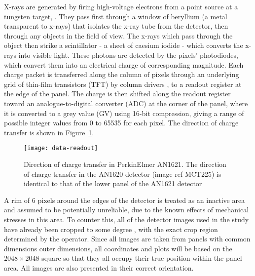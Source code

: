 \documentclass[\main/IO-Pixels.tex]{subfiles}
\begin{document}
X-rays are generated by firing high-voltage electrons from a point source  at a tungsten target, . They pass first through a window of beryllium (a metal transparent to x-rays) that isolates the x-ray tube from the detector, then through any objects in the field of view. The x-rays which pass through the object then strike a scintillator - a sheet of caesium iodide - which converts the x-rays into visible light. These photons are detected by the pixels' photodiodes, which convert them into an electrical charge of corresponding magnitude. Each charge packet is transferred  along the column of pixels through an underlying grid of thin-film transistors (TFT) by column drivers , to a readout register at the edge of the panel. The charge is then shifted along the readout register toward an analogue-to-digital converter (ADC) at the corner of the panel, where it is converted to a grey value (GV) using 16-bit compression, giving a range of possible integer values from 0 to 65535 for each pixel. The direction of charge transfer is shown in Figure~\ref{fig:charge-transfer-direction}. 

\begin{figure}[!ht]
\caption{ Direction of charge transfer in PerkinElmer AN1621. The direction of charge transfer in the AN1620 detector (image ref MCT225) is identical to that of the lower panel of the AN1621 detector }
\label{fig:charge-transfer-direction}
\texttt{[image: data-readout]}
\end{figure} 


A rim of 6 pixels around the edges of the detector is treated as an inactive area and assumed to be potentially unreliable, due to the known effects of mechanical stresses in this area. To counter this, all of the detector images used in the study have already been cropped to some degree
, with the exact crop region determined by the operator.  Since all images are taken from panels with common dimensions outer dimensions, all coordinates and plots will be based on the $2048 \times 2048$ square so that they all occupy their true position within the panel area. All images are also presented in their correct orientation.
  
\end{document}
